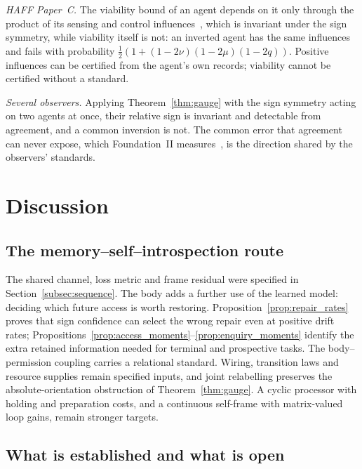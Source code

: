 \documentclass[12pt]{article}
\theoremstyle{definition}
\begin{document}
\emph{HAFF Paper~C.} The viability bound of an agent depends on it only through the product of its sensing and control influences~\cite{Liu2026HAFF_C}, which is invariant under the sign symmetry, while viability itself is not: an inverted agent has the same influences and fails with probability $\tfrac12(1+(1-2\nu)(1-2\mu)(1-2q))$. Positive influences can be certified from the agent's own records; viability cannot be certified without a standard.

\emph{Several observers.} Applying Theorem~\ref{thm:gauge} with the sign symmetry acting on two agents at once, their relative sign is invariant and detectable from agreement, and a common inversion is not. The common error that agreement can never expose, which Foundation~II measures~\cite{Liu2026FII}, is the direction shared by the observers' standards.


\section{Discussion}
\label{sec:discussion}

\subsection{The memory--self--introspection route}
\label{subsec:logic_chain}



The shared channel, loss metric and frame residual were specified in Section~\ref{subsec:sequence}. The body adds a further use of the learned model: deciding which future access is worth restoring. Proposition~\ref{prop:repair_rates} proves that sign confidence can select the wrong repair even at positive drift rates; Propositions~\ref{prop:access_moments}--\ref{prop:enquiry_moments} identify the extra retained information needed for terminal and prospective tasks. The body--permission coupling carries a relational standard. Wiring, transition laws and resource supplies remain specified inputs, and joint relabelling preserves the absolute-orientation obstruction of Theorem~\ref{thm:gauge}. A cyclic processor with holding and preparation costs, and a continuous self-frame with matrix-valued loop gains, remain stronger targets.

\subsection{What is established and what is open}
\label{subsec:claims}
\end{document}
